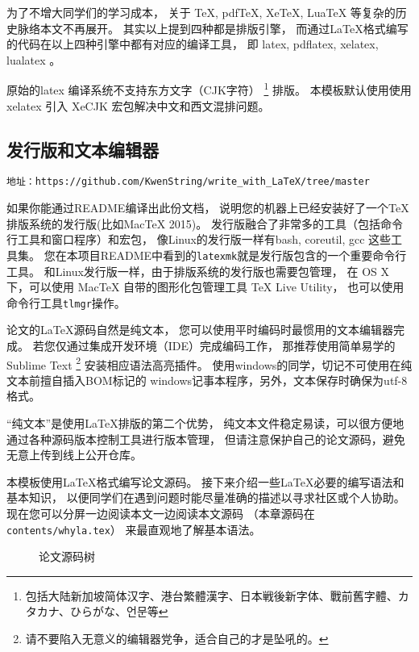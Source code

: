 为了不增大同学们的学习成本，
关于 TeX, pdfTeX,  XeTeX,  LuaTeX 等复杂的历史脉络本文不再展开。
其实以上提到四种都是排版引擎，
而通过\LaTeX 格式编写的代码在以上四种引擎中都有对应的编译工具，
即 latex, pdflatex, xelatex, lualatex 。

原始的latex 编译系统不支持东方文字（CJK字符）
\footnote{包括大陆新加坡简体汉字、港台繁體漢字、日本戦後新字体、戰前舊字體、カタカナ、ひらがな、언문等}
排版。
本模板默认使用使用 xelatex 引入 XeCJK 宏包解决中文和西文混排问题。

\subsection{发行版和文本编辑器}
\begin{verbatim}
地址：https://github.com/KwenString/write_with_LaTeX/tree/master
\end{verbatim}
如果你能通过README编译出此份文档，
说明您的机器上已经安装好了一个\TeX 排版系统的发行版(比如MacTeX 2015)。
发行版融合了非常多的工具（包括命令行工具和窗口程序）和宏包，
像Linux的发行版一样有bash, coreutil, gcc 这些工具集。
您在本项目README中看到的\texttt{latexmk}就是发行版包含的一个重要命令行工具。
和Linux发行版一样，由于排版系统的发行版也需要包管理，
在 OS X 下，可以使用 MacTeX 自带的图形化包管理工具 TeX Live Utility，
也可以使用命令行工具\texttt{tlmgr}操作。

论文的\LaTeX 源码自然是纯文本，
您可以使用平时编码时最惯用的文本编辑器完成。
若您仅通过集成开发环境（IDE）完成编码工作，
那推荐使用简单易学的Sublime Text
\footnote{请不要陷入无意义的编辑器党争，适合自己的才是坠吼的。}
安装相应语法高亮插件。
使用windows的同学，切记不可使用在纯文本前擅自插入BOM标记的
windows记事本程序，另外，文本保存时确保为utf-8格式。

“纯文本”是使用\LaTeX 排版的第二个优势，
纯文本文件稳定易读，可以很方便地通过各种源码版本控制工具进行版本管理，
但请注意保护自己的论文源码，避免无意上传到线上公开仓库。

本模板使用\LaTeX 格式编写论文源码。
\label{dirtree}
接下来介绍一些\LaTeX 必要的编写语法和基本知识，
以便同学们在遇到问题时能尽量准确的描述以寻求社区或个人协助。
现在您可以分屏一边阅读本文一边阅读本文源码
（本章源码在\texttt{contents/whyla.tex}）
来最直观地了解基本语法。

\begin{figure}[htbp]
    \centering
    \caption{论文源码树}
\end{figure}

